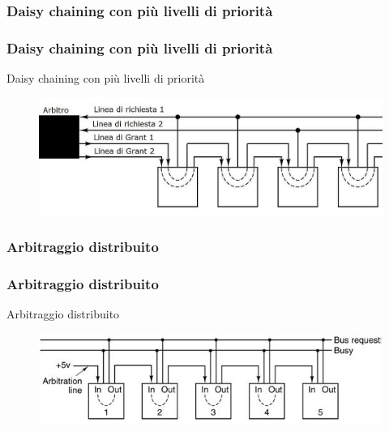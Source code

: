 \subsubsection[Daisy chaining con più livelli di priorità]{Daisy chaining con più livelli di priorità}
\begin{frame}
	\frametitle{Daisy chaining con più livelli di priorità}
	  
	\begin{block}{Daisy chaining con più livelli di priorità}
		\begin{figure}[!htbp]
			\centering
			\includegraphics[width=0.8\linewidth]{images/6_bus/daisy_chaining_lev_n.jpg}
		\end{figure}
	\end{block}
\end{frame}



\subsubsection[Arbitraggio distribuito]{Arbitraggio distribuito}
\begin{frame}
	\frametitle{Arbitraggio distribuito}
	  
	\begin{block}{Arbitraggio distribuito}
		\begin{figure}[!htbp]
			\centering
			\includegraphics[width=0.8\linewidth]{images/6_bus/daisy_chaining_distributed.jpg}
		\end{figure}
		
	\end{block}
\end{frame}








